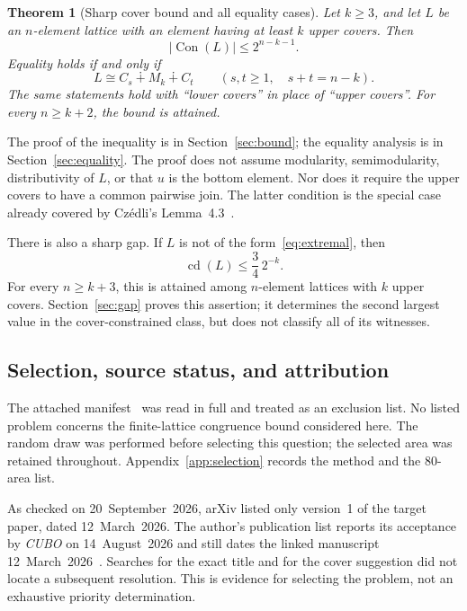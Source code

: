 \documentclass[11pt,a4paper]{article}
\numberwithin{equation}{section}
\newtheorem{theorem}{Theorem}[section]
\theoremstyle{definition}
\theoremstyle{remark}
\DeclareMathOperator{\Con}{Con}
\DeclareMathOperator{\cdens}{cd}
\newcommand{\glue}{\mathbin{\dotplus}}
\newcommand{\card}[1]{\lvert #1\rvert}
\begin{document}
\begin{theorem}[Sharp cover bound and all equality cases]\label{thm:main}
Let $k\ge3$, and let $L$ be an $n$-element lattice with an element having at least
$k$ upper covers. Then
\begin{equation}\label{eq:main}
 \card{\Con(L)}\le2^{n-k-1}.
\end{equation}
Equality holds if and only if
\begin{equation}\label{eq:extremal}
 L\cong C_s\glue M_k\glue C_t
 \qquad(s,t\ge1,\quad s+t=n-k).
\end{equation}
The same statements hold with ``lower covers'' in place of ``upper covers''.
For every $n\ge k+2$, the bound is attained.
\end{theorem}

The proof of the inequality is in Section~\ref{sec:bound}; the equality analysis
is in Section~\ref{sec:equality}. The proof does not assume modularity,
semimodularity, distributivity of $L$, or that $u$ is the bottom element.
Nor does it require the upper covers to have a common pairwise join.
The latter condition is the special case already covered by
Cz\'edli's Lemma~4.3~\cite{czedli}.

There is also a sharp gap. If $L$ is not of the form~\eqref{eq:extremal}, then
\begin{equation}\label{eq:gap-intro}
 \cdens(L)\le\frac34\,2^{-k}.
\end{equation}
For every $n\ge k+3$, this is attained among $n$-element lattices with $k$ upper
covers. Section~\ref{sec:gap} proves this assertion; it determines the second
largest value in the cover-constrained class, but does not classify all of its
witnesses.

\subsection{Selection, source status, and attribution}
The attached manifest~\cite{manifest} was read in full and treated as an exclusion
list. No listed problem concerns the finite-lattice congruence bound considered
here. The random draw was performed before selecting this question; the selected
area was retained throughout. Appendix~\ref{app:selection} records the method
and the 80-area list.

As checked on 20~September~2026, arXiv listed only version~1 of the target paper,
dated 12~March~2026. The author's publication list reports its acceptance by
\emph{CUBO} on 14~August~2026 and still dates the linked manuscript
12~March~2026~\cite{publist}. Searches for the exact title and for the cover
suggestion did not locate a subsequent resolution. This is evidence for selecting
the problem, not an exhaustive priority determination.
\end{document}
